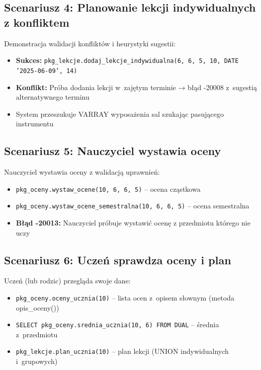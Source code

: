 \documentclass[12pt,a4paper]{article}
\begin{document}
\subsection{Scenariusz 4: Planowanie lekcji indywidualnych z konfliktem}

Demonstracja walidacji konfliktów i heurystyki sugestii:

\begin{itemize}[nosep]
    \item \textbf{Sukces:} \texttt{pkg\_lekcje.dodaj\_lekcje\_indywidualna(6, 6, 5, 10, DATE '2025-06-09', 14)}
    \item \textbf{Konflikt:} Próba dodania lekcji w~zajętym terminie → błąd -20008 z~sugestią alternatywnego terminu
    \item System przeszukuje VARRAY wyposażenia sal szukając pasującego instrumentu
\end{itemize}

\subsection{Scenariusz 5: Nauczyciel wystawia oceny}

Nauczyciel wystawia oceny z walidacją uprawnień:

\begin{itemize}[nosep]
    \item \texttt{pkg\_oceny.wystaw\_ocene(10, 6, 6, 5)} -- ocena cząstkowa
    \item \texttt{pkg\_oceny.wystaw\_ocene\_semestralna(10, 6, 6, 5)} -- ocena semestralna
    \item \textbf{Błąd -20013:} Nauczyciel próbuje wystawić ocenę z przedmiotu którego nie uczy
\end{itemize}

\subsection{Scenariusz 6: Uczeń sprawdza oceny i plan}

Uczeń (lub rodzic) przegląda swoje dane:

\begin{itemize}[nosep]
    \item \texttt{pkg\_oceny.oceny\_ucznia(10)} -- lista ocen z~opisem słownym (metoda opis\_oceny())
    \item \texttt{SELECT pkg\_oceny.srednia\_ucznia(10, 6) FROM DUAL} -- średnia z~przedmiotu
    \item \texttt{pkg\_lekcje.plan\_ucznia(10)} -- plan lekcji (UNION indywidualnych i~grupowych)
\end{itemize}
\end{document}
